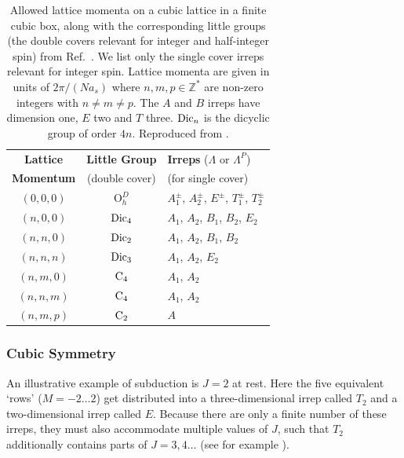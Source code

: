 \begin{table}
\caption{Allowed lattice momenta on a cubic lattice in a finite cubic box, along with the corresponding little groups (the double covers relevant for integer and half-integer spin) from Ref.~\cite{Moore:2005dw,Moore:2006ng}.  We list only the single cover irreps relevant for integer spin.  Lattice momenta are given in units of $2\pi / (N a_s)$ where $n,m,p \in \mathbb{Z}^*$ are non-zero integers with $n \neq m \neq p$.  The $A$ and $B$ irreps have dimension one, $E$ two and $T$ three.  $\text{Dic}_n$ is the dicyclic group of order $4n$. Reproduced from \cite{Thomas:2011rh}. \label{tab::littlegroups}}
\begin{center}
\begin{tabular}{c|c|l}
\textbf{Lattice} & \textbf{Little Group} & \textbf{Irreps} ($\Lambda$ or $\Lambda^P$) \\
\textbf{Momentum} & (double cover) & (for single cover) \\
\hline
$(0,0,0)$ & $\text{O}_h^D$ & $A_1^{\pm}$, $A_2^{\pm}$, $E^{\pm}$, $T_1^{\pm}$, $T_2^{\pm}$ \\
$(n,0,0)$ & $\text{Dic}_4$ & $A_1$, $A_2$, $B_1$, $B_2$, $E_2$ \\
$(n,n,0)$ & $\text{Dic}_2$ & $A_1$, $A_2$, $B_1$, $B_2$ \\
$(n,n,n)$ & $\text{Dic}_3$ & $A_1$, $A_2$, $E_2$ \\
$(n,m,0)$ & $\text{C}_4$ & $A_1$, $A_2$ \\
$(n,n,m)$ & $\text{C}_4$ & $A_1$, $A_2$ \\
$(n,m,p)$ & $\text{C}_2$ & $A$ \\
\hline
\end{tabular}
\end{center}
\end{table} 
 



\subsubsection{Cubic Symmetry}\label{Spec::Cubic}

An illustrative example of subduction is $J=2$ at rest. Here the five equivalent `rows' ($M=-2 \ldots 2$) get distributed into a three-dimensional irrep called $T_2$ and a two-dimensional irrep called $E$. Because there are only a finite number of these irreps, they must also accommodate multiple values of $J$, such that $T_2$ additionally contains parts of $J=3,4\ldots$ (see for example ). 

